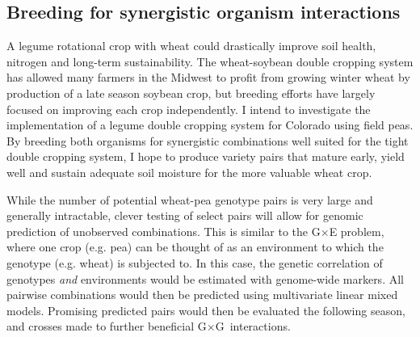 \documentclass[11pt]{article}
\newcommand{\gxg}{G$\times$G}
\begin{document}
\subsection*{Breeding for synergistic organism interactions}

A legume rotational crop with wheat could drastically improve soil health, nitrogen and long-term sustainability. The wheat-soybean double cropping system has allowed many farmers in the Midwest to profit from growing winter wheat by production of a late season soybean crop, but breeding efforts have largely focused on improving each crop independently. I intend to investigate the implementation of a legume double cropping system for Colorado using field peas. By breeding both organisms for synergistic combinations well suited for the tight double cropping system, I hope to produce variety pairs that mature early, yield well and sustain adequate soil moisture for the more valuable wheat crop. 


While the number of potential wheat-pea genotype pairs is very large and generally intractable, clever testing of select pairs will allow for genomic prediction of unobserved combinations. This is similar to the G$\times$E problem, where one crop (e.g. pea) can be thought of as an environment to which the genotype (e.g. wheat) is subjected to. In this case, the genetic correlation of genotypes \emph{and} environments would be estimated with genome-wide markers. All pairwise combinations would then be predicted using multivariate linear mixed models. Promising predicted pairs would then be evaluated the following season, and crosses made to further beneficial \gxg\ interactions. %

\end{document}
